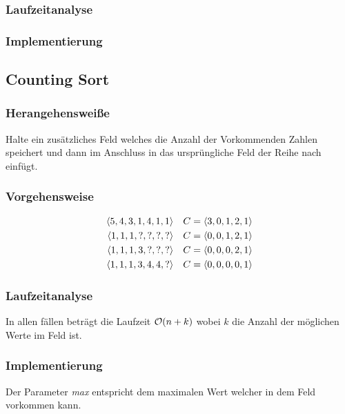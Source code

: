 \documentclass[10pt,a4paper]{article}
\begin{document}
\begin{multicols*}{4}
\subsubsection*{Laufzeitanalyse}
\subsubsection*{Implementierung}

\subsection{Counting Sort}
\subsubsection*{Herangehensweiße}
Halte ein zusätzliches Feld welches die Anzahl der Vorkommenden Zahlen speichert und dann im Anschluss in das
ursprüngliche Feld der Reihe nach einfügt.
\subsubsection*{Vorgehensweise}
\begin{align*}
	\langle5,4,3,1,4,1,1\rangle & \quad C = \langle3,0,1,2,1\rangle \\
	\langle1,1,1,?,?,?,?\rangle & \quad C = \langle0,0,1,2,1\rangle \\
	\langle1,1,1,3,?,?,?\rangle & \quad C = \langle0,0,0,2,1\rangle \\
	\langle1,1,1,3,4,4,?\rangle & \quad C = \langle0,0,0,0,1\rangle
\end{align*}
\subsubsection*{Laufzeitanalyse}
In allen fällen beträgt die Laufzeit \(\mathcal{O}(n+k)\) wobei \(k\) die Anzahl der möglichen Werte im Feld ist.
\subsubsection*{Implementierung}
Der Parameter \textit{max} entspricht dem maximalen Wert welcher in dem Feld vorkommen kann. \hfill



\end{multicols*}
\end{document}

